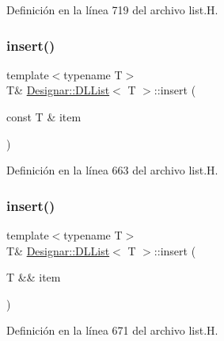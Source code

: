 Definición en la línea 719 del archivo list.\+H.

\mbox{\label{class_designar_1_1_d_l_list_ad153fdaa8982b2276266e1e0dbb8b773}} 
\subsubsection{\texorpdfstring{insert()}{insert()}\hspace{0.1cm}{\footnotesize\ttfamily [1/2]}}
{\footnotesize\ttfamily template$<$typename T$>$ \\
T\& \hyperlink{class_designar_1_1_d_l_list}{Designar\+::\+D\+L\+List}$<$ T $>$\+::insert (\begin{DoxyParamCaption}\item[{const T \&}]{item }\end{DoxyParamCaption})\hspace{0.3cm}{\ttfamily [inline]}}



Definición en la línea 663 del archivo list.\+H.

\mbox{\label{class_designar_1_1_d_l_list_a4a88465e07f8708eea591614b5822bb6}} 
\subsubsection{\texorpdfstring{insert()}{insert()}\hspace{0.1cm}{\footnotesize\ttfamily [2/2]}}
{\footnotesize\ttfamily template$<$typename T$>$ \\
T\& \hyperlink{class_designar_1_1_d_l_list}{Designar\+::\+D\+L\+List}$<$ T $>$\+::insert (\begin{DoxyParamCaption}\item[{T \&\&}]{item }\end{DoxyParamCaption})\hspace{0.3cm}{\ttfamily [inline]}}



Definición en la línea 671 del archivo list.\+H.

\mbox{\label{class_designar_1_1_d_l_list_a3fda59e4bde20b86ee0cc0f083fc5f3a}} 
